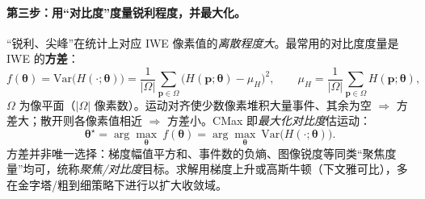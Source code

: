 \paragraph{第三步：用“对比度”度量锐利程度，并最大化。}
“锐利、尖峰”在统计上对应 IWE 像素值的\emph{离散程度大}。最常用的对比度度量是 IWE 的\textbf{方差}\cite{gallego2018cmax}：
\begin{equation}
  f(\boldsymbol\theta)=\mathrm{Var}\big(H(\cdot;\boldsymbol\theta)\big)
  =\frac{1}{|\Omega|}\sum_{\mathbf p\in\Omega}\big(H(\mathbf p;\boldsymbol\theta)-\mu_H\big)^2,
  \qquad \mu_H=\frac{1}{|\Omega|}\sum_{\mathbf p\in\Omega}H(\mathbf p;\boldsymbol\theta),
  \label{eq:cmax-var}
\end{equation}
$\Omega$ 为像平面（$|\Omega|$ 像素数）。运动对齐使少数像素堆积大量事件、其余为空 $\Rightarrow$ 方差大；散开则各像素值相近 $\Rightarrow$ 方差小。CMax 即\emph{最大化对比度}估运动：
\begin{equation}
  \boxed{\ \boldsymbol\theta^\star=\arg\max_{\boldsymbol\theta}\ f(\boldsymbol\theta)=\arg\max_{\boldsymbol\theta}\ \mathrm{Var}\big(H(\cdot;\boldsymbol\theta)\big).\ }
  \label{eq:cmax-obj}
\end{equation}
方差并非唯一选择：梯度幅值平方和、事件数的负熵、图像锐度等同类“聚焦度量”均可，统称\emph{聚焦/对比度}目标\cite{gallego2018cmax}。求解用梯度上升或高斯牛顿（下文雅可比），多在金字塔/粗到细策略下进行以扩大收敛域。

